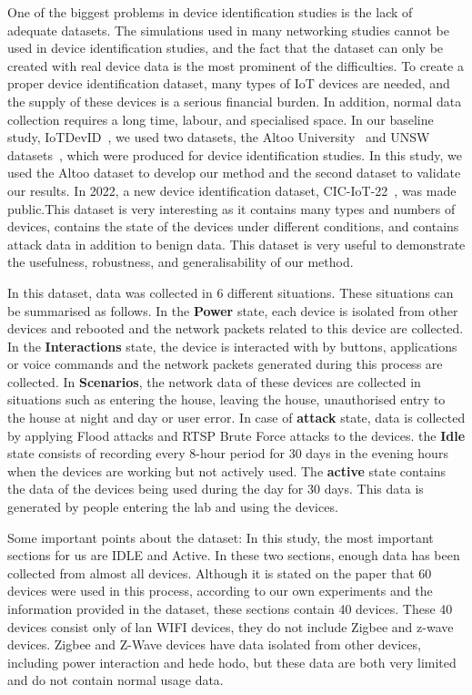 \documentclass[journal]{IEEEtran}
\begin{document}
One of the biggest problems in device identification studies is the lack of adequate datasets. The simulations used in many networking studies cannot be used in device identification studies, and the fact that the dataset can only be created with real device data is the most prominent of the difficulties. To create a proper device identification dataset, many types of IoT devices are needed, and the supply of these devices is a serious financial burden. In addition, normal data collection requires a long time, labour, and specialised space. In our baseline study, IoTDevID~\cite{Kostas2022IoTDevID}, we used two datasets, the Altoo  University~\cite{miettinen2017iot,aalto2017dataset} and UNSW datasets~\cite{sivanathan2018classifying}, which were produced for device identification studies. In this study, we used the Altoo dataset to develop our method and the second dataset to validate our results. In 2022, a new device identification dataset, CIC-IoT-22~\cite{CIC}, was made public.This dataset is very interesting as it contains many types and numbers of devices, contains the state of the devices under different conditions, and contains attack data in addition to benign data.  This dataset is very useful to demonstrate the usefulness, robustness, and generalisability of our method. 




In this dataset, data was collected in 6 different situations. These situations can be summarised as follows. 
In the \textbf{Power} state, each device is isolated from other devices and rebooted and the network packets related to this device are collected.
In the \textbf{Interactions} state, the device is interacted with by buttons, applications or voice commands and the network packets generated during this process are collected.
In \textbf{Scenarios}, the network data of these devices are collected in situations such as entering the house, leaving the house, unauthorised entry to the house at night and day or user error. 
In case of \textbf{attack} state, data is collected by applying Flood attacks and RTSP Brute Force attacks to the devices.
the \textbf{Idle} state consists of recording every 8-hour period for 30 days in the evening hours when the devices are working but not actively used.
The \textbf{active} state contains the data of the devices being used during the day for 30 days. This data is generated by people entering the lab and using the devices.

Some important points about the dataset:
In this study, the most important sections for us are IDLE and Active. In these two sections, enough data has been collected from almost all devices. Although it is stated on the paper that 60 devices were used in this process, according to our own experiments and the information provided in the dataset, these sections contain 40 devices. These 40 devices consist only of lan WIFI devices, they do not include Zigbee and z-wave devices. Zigbee and Z-Wave devices have data isolated from other devices, including power interaction and hede hodo, but these data are both very limited and do not contain normal usage data.
\end{document}
